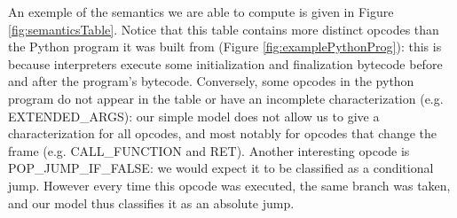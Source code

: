 \documentclass[english]{article}
\begin{document}
An exemple of the semantics we are able to compute is given in Figure \ref{fig:semanticsTable}. Notice that this table contains more distinct opcodes than the Python program it was built from (Figure \ref{fig:examplePythonProg}): this is because interpreters execute some initialization and finalization bytecode before and after the program's bytecode. Conversely, some opcodes in the python program do not appear in the table or have an incomplete characterization (e.g. EXTENDED\_ARGS): our simple model does not allow us to give a characterization for all opcodes, and most notably for opcodes that change the frame (e.g. CALL\_FUNCTION and RET). Another interesting opcode is POP\_JUMP\_IF\_FALSE: we would expect it to be classified as a conditional jump. However every time this opcode was executed, the same branch was taken, and our model thus classifies it as an absolute jump.
\end{document}

